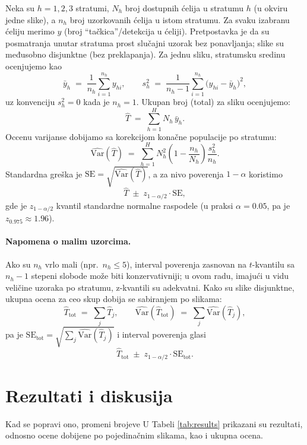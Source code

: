 \documentclass[a4paper,12pt]{article}
\begin{document}
Neka su $h=1,2,3$ stratumi, $N_h$ broj dostupnih ćelija u stratumu $h$ (u okviru jedne slike), a $n_h$ broj uzorkovanih ćelija u istom stratumu. 
Za svaku izabranu ćeliju merimo $y$ (broj ``tačkica''/detekcija u ćeliji). Pretpostavka je da su posmatranja unutar stratuma prost slučajni uzorak bez ponavljanja; slike su međusobno disjunktne (bez preklapanja).
\newline
\newline
\noindent
Za jednu sliku, stratumsku sredinu ocenjujemo kao
\[
\bar y_h \;=\; \frac{1}{n_h}\sum_{i=1}^{n_h} y_{hi}, 
\qquad
s_h^2 \;=\; \frac{1}{n_h-1}\sum_{i=1}^{n_h}\bigl(y_{hi}-\bar y_h\bigr)^2,
\]
uz konvenciju $s_h^2=0$ kada je $n_h=1$.
Ukupan broj (total) za sliku ocenjujemo:
\[
\hat T \;=\; \sum_{h=1}^H N_h\,\bar y_h.
\]
Occenu varijanse dobijamo sa korekcijom konačne populacije po stratumu:
\[
\widehat{\mathrm{Var}}(\hat T) \;=\; \sum_{h=1}^H 
N_h^2 \left(1-\frac{n_h}{N_h}\right)\frac{s_h^2}{n_h}.
\]
Standardna greška je $\mathrm{SE}=\sqrt{\widehat{\mathrm{Var}}(\hat T)}$, a za nivo poverenja $1-\alpha$ koristimo
\[
\hat T \;\pm\; z_{1-\alpha/2}\cdot \mathrm{SE},
\]
gde je $z_{1-\alpha/2}$ kvantil standardne normalne raspodele (u praksi $\alpha=0{.}05$, pa je $z_{0{.}975}\approx 1{.}96$).

\paragraph{Napomena o malim uzorcima.}
Ako su $n_h$ vrlo mali (npr.\ $n_h\le 5$), interval poverenja zasnovan na $t$-kvantilu sa $n_h-1$ stepeni slobode može biti konzervativniji; u ovom radu, imajući u vidu veličine uzoraka po stratumu, z-kvantili su adekvatni.
\newline
\newline
\noindent
Kako su slike disjunktne, ukupna ocena za ceo skup dobija se sabiranjem po slikama:
\[
\hat T_{\mathrm{tot}} \;=\; \sum_{j} \hat T_j,
\qquad
\widehat{\mathrm{Var}}(\hat T_{\mathrm{tot}}) \;=\; \sum_{j} \widehat{\mathrm{Var}}(\hat T_j),
\]
pa je $\mathrm{SE}_{\mathrm{tot}}=\sqrt{\sum_j \widehat{\mathrm{Var}}(\hat T_j)}$ i interval poverenja glasi
\[
\hat T_{\mathrm{tot}} \;\pm\; z_{1-\alpha/2}\cdot \mathrm{SE}_{\mathrm{tot}}.
\]


\section{Rezultati i diskusija}

Kad se popravi ono, promeni brojeve 
\newline
\noindent
U Tabeli \ref{tab:results} prikazani su rezultati, odnosno ocene dobijene po pojedinačnim slikama, kao i ukupna ocena.
\end{document}
